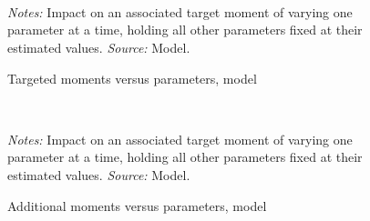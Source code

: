 \begin{figure}[!htb]
  \centering
  \caption{Targeted moments versus parameters, model\label{figure: identification 3}}
  \prefigvspace
  \\
  \\
  \\
  \postfigvspace
  \begin{minipage}[t]{1\columnwidth}%
    \begin{spacing}{0.75}
      \emph{\scriptsize{}Notes: }{\scriptsize{}Impact on an associated target moment of varying one parameter at a time, holding all other parameters fixed at their estimated values. %
      \emph{\scriptsize{}Source: } Model.}
    \end{spacing}
  \end{minipage}
\end{figure}

\clearpage

\begin{figure}[!htb]
  \centering
  \caption{Additional moments versus parameters, model\label{figure: identification 4}}
  \prefigvspace
  \\
  \postfigvspace
  \begin{minipage}[t]{1\columnwidth}%
    \begin{spacing}{0.75}
      \emph{\scriptsize{}Notes: }{\scriptsize{}Impact on an associated target moment of varying one parameter at a time, holding all other parameters fixed at their estimated values. %
      \emph{\scriptsize{}Source: } Model.}
    \end{spacing}
  \end{minipage}
\end{figure}




